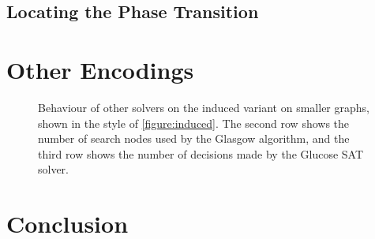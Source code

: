 \documentclass[letterpaper]{article}
\begin{document}
\subsection{Locating the Phase Transition}

\section{Other Encodings}

\begin{figure*}
    \hskip-1.2cm
    \setlength{\abovecaptionskip}{-2em}
    \caption{Behaviour of other solvers on the induced variant on smaller graphs, shown in the style of
        \cref{figure:induced}. The second row shows the number of search nodes used by the Glasgow
        algorithm, and the third row shows the number of decisions made by the Glucose SAT solver.}
\end{figure*}

\section{Conclusion}



\end{document}
